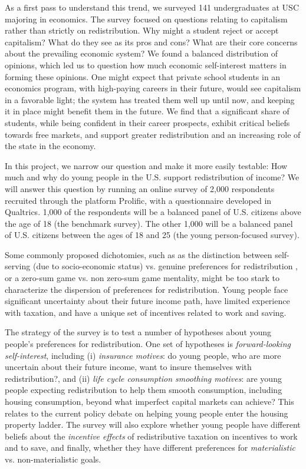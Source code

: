 \documentclass[11pt, headsepline]{article}
\begin{document}
As a first pass to understand this trend, we surveyed 141 undergraduates at USC majoring in economics. The survey focused on questions relating to capitalism rather than strictly on redistribution. Why might a student reject or accept capitalism? What do they see as its pros and cons? What are their core concerns about the prevailing economic system? We found a balanced distribution of opinions, which led us to question how much economic self-interest matters in forming these opinions. One might expect that private school students in an economics program, with high-paying careers in their future, would see capitalism in a favorable light; the system has treated them well up until now, and keeping it in place might benefit them in the future. We find that a significant share of students, while being confident in their career prospects, exhibit critical beliefs towards free markets, and support greater redistribution and an increasing role of the state in the economy.

In this project, we narrow our question and make it more easily testable: How much and why do young people in the U.S. support redistribution of income?  We will answer this question by running an online survey of 2,000 respondents recruited through the platform Prolific, with a questionnaire developed in Qualtrics. 1,000 of the respondents will be a balanced panel of U.S. citizens above the age of 18 (the benchmark survey). The other 1,000 will be a balanced panel of U.S. citizens between the ages of 18 and 25 (the young person-focused survey). 

Some commonly proposed dichotomies, such as as the distinction between self-serving (due to socio-economic status)  vs. genuine preferences for redistribution \citep{landier2008investigating}, or a zero-sum game vs. non zero-sum game mentality, might be too stark to characterize the dispersion of preferences for redistribution.  Young people face significant uncertainty about their future income path, have limited experience with taxation, and have a unique set of incentives related to work and saving.

The strategy of the survey is to test a number of hypotheses about young people's preferences for redistribution. One set of hypotheses is \textit{forward-looking self-interest}, including (i) \textit{insurance motives}: do young people, who are more uncertain about their future income, want to insure themselves with redistribution?, and (ii) \textit{life cycle consumption smoothing motives}: are young people expecting redistribution to help them smooth consumption, including housing consumption, beyond what imperfect capital markets can achieve? This relates to the current policy debate on helping young people enter the housing property ladder. The survey will also explore whether young people have different beliefs about the \textit{incentive effects} of redistributive taxation on incentives to work and to save, and finally, whether they have different preferences for \textit{materialistic} vs. non-materialistic goals.
\end{document}
